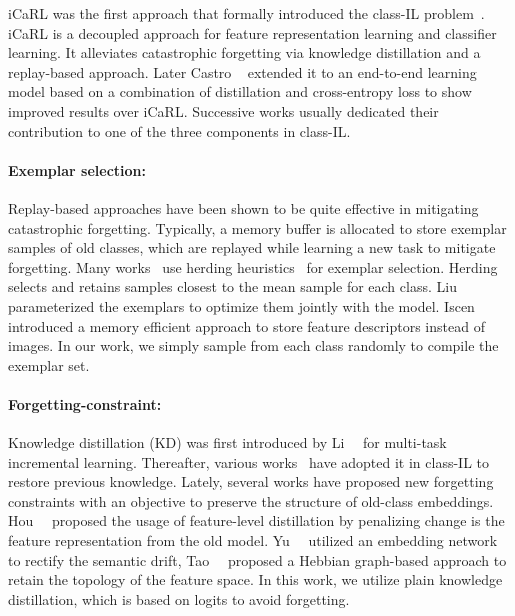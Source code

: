 \documentclass[final]{cvpr}
\begin{document}
iCaRL was the first approach that formally introduced the class-IL problem~\cite{icarl}. iCaRL is a decoupled approach for feature representation learning and classifier learning. It alleviates catastrophic forgetting via knowledge distillation and a replay-based approach. Later Castro \etal ~\cite{eeil} extended it to an end-to-end learning model based on a combination of distillation and cross-entropy loss to show improved results over iCaRL.
Successive works usually dedicated their contribution to one of the three components in class-IL.

\paragraph{Exemplar selection:}
Replay-based approaches have been shown to be quite effective in mitigating catastrophic forgetting. Typically, a memory buffer is allocated to store exemplar samples of old classes, which are replayed while learning a new task to mitigate forgetting. Many works~\cite{eeil, lucir, icarl, bic} use herding heuristics~\cite{herding} for exemplar selection. Herding selects and retains samples closest to the mean sample for each class.
Liu~\etal~\cite{mnemonics} parameterized the exemplars to optimize them jointly with the model. Iscen~\etal~\cite{memory_efficient} introduced a memory efficient approach to store feature descriptors instead of images. In our work, we simply sample from each class randomly to compile the exemplar set. 

\paragraph{Forgetting-constraint:}
Knowledge distillation (KD) was first introduced by Li~\etal~\cite{lwf} for multi-task incremental learning. Thereafter, various works~\cite{eeil, icarl, bic} have adopted it in class-IL to restore previous knowledge. Lately, several works have proposed new forgetting constraints with an objective to preserve the structure of old-class embeddings. Hou~\etal~\cite{lucir} proposed the usage of feature-level distillation by penalizing change is the feature representation from the old model. Yu~\etal~\cite{semantic_drift} utilized an embedding network to rectify the semantic drift, Tao~\etal~\cite{tpcil} proposed a Hebbian graph-based approach to retain the topology of the feature space. In this work, we utilize plain knowledge distillation, which is based on logits to avoid forgetting.
\end{document}
